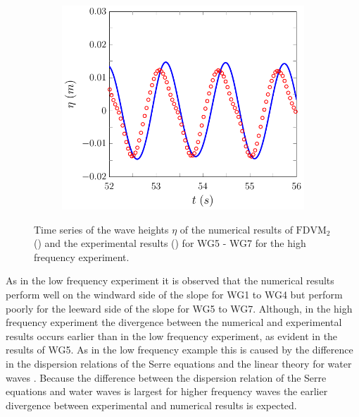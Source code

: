 \begin{figure}
\begin{subfigure}{0.5\textwidth}
		\vspace{0.5cm}
	\end{subfigure}
	\begin{subfigure}{0.5\textwidth}
		\includegraphics[width=\textwidth]{./chp6/figures/Experiment/Beji/sh/FDVMWG7.pdf}
		\vspace{0.5cm}
	\end{subfigure}
	\caption{Time series of the wave heights $\eta$ of the numerical results of $\text{FDVM}_2$ ({\color{blue}\solidrule}) and the experimental results () for WG5 - WG7 for the high frequency experiment.}
	\label{fig:BejishWG5to7FDVM}
\end{figure}

As in the low frequency experiment it is observed that the numerical results perform well on the windward side of the slope for WG1 to WG4 but perform poorly for the leeward side of the slope for WG5 to WG7. Although, in the high frequency experiment the divergence between the numerical and experimental results occurs earlier than in the low frequency experiment, as evident in the results of WG5. As in the low frequency example this is caused by the difference in the dispersion relations of the Serre equations and the linear theory for water waves \cite{Beji-Battjes-1994-1,Lannes-2013}. Because the difference between the dispersion relation of the Serre equations and water waves is largest for higher frequency waves \cite{Barthelemy-2004-315} the earlier divergence between experimental and numerical results is expected. 

